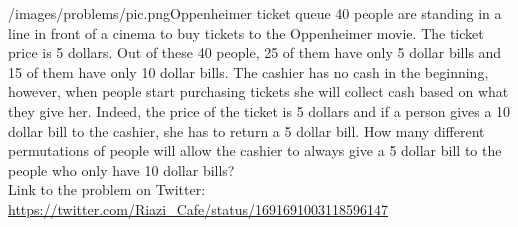 \begin{problem}{/images/problems/pic.png}{Oppenheimer ticket queue}
40 people are standing in a line in front of a cinema to buy tickets to the Oppenheimer movie. The ticket price is 5 dollars. Out of these 40 people, 25 of them have only 5 dollar bills and 15 of them have only 10 dollar bills. The cashier has no cash in the beginning, however, when people start purchasing tickets she will collect cash based on what they give her. Indeed, the price of the ticket is 5 dollars and if a person gives a 10 dollar bill to the cashier, she has to return a 5 dollar bill. How many different permutations of people will allow the cashier to always give a 5 dollar bill to the people who only have 10 dollar bills?\\[0.2cm]

Link to the problem on Twitter:  \url{https://twitter.com/Riazi_Cafe/status/1691691003118596147}
\end{problem}
